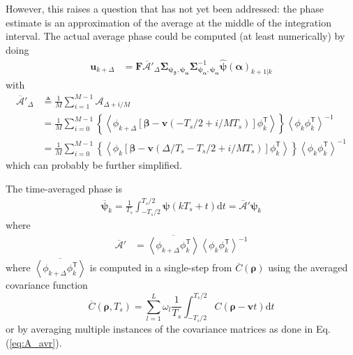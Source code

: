\documentclass[a4paper,12pt]{article}
\newcommand{\average}[1]{\left \langle {#1} \right \rangle}
\newcommand{\T}{\mathsf{T}} %
\newcommand{\0}{\mathsf{0}} %
\newcommand{\CovMat}{\boldsymbol{\Sigma}} %
\newcommand{\dint}{\mathrm{d}} %
\newcommand{\alphavec}{{\boldsymbol{\alpha}}}
\newcommand{\betavec}{{\boldsymbol{\beta}}}
\newcommand{\rhovec}{\boldsymbol{\rho}}%
\newcommand{\phivec}{{\boldsymbol{\psi}}}
\newcommand{\uvec}{{\mathbf{u}}}
\begin{document}
However, this raises a question that has not yet been addressed: the phase estimate is an approximation of the average at the middle of the integration interval. The actual average phase could be computed (at least numerically) by doing
\begin{align}\label{eq:u_avr}
  \uvec_{k+\Delta} & = \mathbf{F} \overline{\mathcal{A}}'_\Delta\CovMat_{\phivec_\betavec,\phivec_\alphavec}\CovMat_{\phivec_\alphavec,\phivec_\alphavec}^{-1} \widehat{\phivec}(\alphavec)_{ k+1|k}
\end{align}
with 
\begin{align}\label{eq:A_avr}
  \overline{\mathcal{A}}'_\Delta & \triangleq \frac{1}{M}\sum_{i=1}^{M-1} \mathcal{A}_{\Delta + i/M} \\
& = \frac{1}{M}\sum_{i=0}^{M-1} \left\{\average{\phi_{k+\Delta }\left[\betavec - \mathbf{v} (-T_s/2 + i/M T_s) \right]\phi_k^\T } \right\} \average{\phi_{k}\phi_k^\T }^{-1} \\
& = \frac{1}{M}\sum_{i=0}^{M-1} \left\{\average{\phi_{k}\left[\betavec - \mathbf{v} (\Delta/T_s -T_s/2 + i/M T_s) \right]\phi_k^\T } \right\} \average{\phi_{k}\phi_k^\T }^{-1}
\end{align}
which can probably be further simplified. %

The time-averaged phase is
\begin{align}
  \overline{\phivec}_k = \frac{1}{T_s}\int_{-T_s/2}^{T_s/2}{\phivec}(kT_s+t) \dint t = 
\overline{\mathcal{A}}'{\phivec}_k 
\end{align}
where 
\begin{align}
  \overline{\mathcal{A}}' & =  \overline{\average{\phi_{k+\Delta}\phi_k^\T } } \average{\phi_{k}\phi_k^\T }^{-1}
\end{align}
where $\overline{\average{\phi_{k+\Delta}\phi_k^\T } }$ is computed in a single-step from $\overline{C}(\boldsymbol{\rho})$ using the averaged covariance function
\begin{equation}
\overline{C}(\rhovec, T_s) = \sum_{l=1}^L \omega_l \frac{1}{T_s}\int_{-T_s/2}^{T_s/2} C(\boldsymbol{\rho} - \mathbf{v} t) \dint t
\end{equation}
or by averaging multiple instances of the covariance matrices as done in Eq. (\ref{eq:A_avr}).
\end{document}
